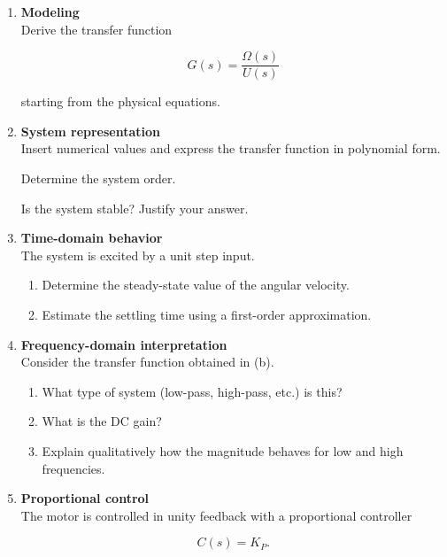 \documentclass[a4paper,12pt]{article}
\begin{document}
\begin{enumerate}

\item[(a)] \textbf{Modeling}~\\

Derive the transfer function

\[
G(s)=\frac{\Omega(s)}{U(s)}
\]

starting from the physical equations.

\item[(b)] \textbf{System representation}~\\

Insert numerical values and express the transfer function in polynomial form.

Determine the system order.

Is the system stable? Justify your answer.

\item[(c)] \textbf{Time-domain behavior}~\\

The system is excited by a unit step input.

\begin{enumerate}
\item[(i)] Determine the steady-state value of the angular velocity.
\item[(ii)] Estimate the settling time using a first-order approximation.
\end{enumerate}

\item[(d)] \textbf{Frequency-domain interpretation}~\\

Consider the transfer function obtained in (b).

\begin{enumerate}
\item[(i)] What type of system (low-pass, high-pass, etc.) is this?
\item[(ii)] What is the DC gain?
\item[(iii)] Explain qualitatively how the magnitude behaves for low and high frequencies.
\end{enumerate}

\item[(e)] \textbf{Proportional control}~\\

The motor is controlled in unity feedback with a proportional controller

\[
C(s)=K_P.
\]


\end{enumerate}
\end{document}
